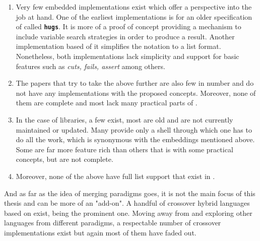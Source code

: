 \documentclass[thesis-solanki.tex]{subfiles}
\begin{document}
\begin{enumerate}
\item Very few embedded implementations exist which offer a perspective into the job at hand. One of the earliest implementations
\cite{website:mini-prolog-hugs98} is for an older specification of  called 
\texttt{\bfseries{hugs}}. It is more of a proof of concept providing a mechanism to include variable search strategies in order to produce
a result. Another implementation \cite{website:takashi-workplace} based of it simplifies the notation to a list format. Nonetheless, both
implementations lack simplicity and support for basic  features such as \textit{cuts, fails, assert} among others.

\begin{comment}
\item Only two embeddings exist, one of them is old and made for \texttt{\bfseries{hugs}} a functional programming system based on the
\progLang{Haskell 98} specification. It is complex and also lacks a lot of \progLang{Prolog} like features including \textit{cuts, fails,
assert} among others. The second one is based off the first one to make it simple but it loses the variable search strategy support which
allows the programmer to choose the manner in which a solution is produced.
\end{comment}

\item The papers that try to take the above further are also few in number and do not have any implementations with the proposed
concepts. Moreover, none of them are complete and most lack many practical parts of .

\item In the case of libraries, a few exist, most are old and are not currently maintained or updated. Many provide only a shell through which one has to do all the work,
which is synonymous with the embeddings mentioned above. Some are far more feature rich than others that is with some practical 
concepts, but are not complete.

\item Moreover, none of the above have full list support that exist in .
\end{enumerate}

And as far as the idea of merging paradigms goes, it is not the main focus of this thesis and can be more of an
"add-on".
A handful of crossover hybrid languages based on  exist,  \cite{website:curry}
being the prominent one.
Moving away from  and exploring other languages from different paradigms, a respectable number of
crossover implementations exist but again most of them have faded out.
\end{document}
